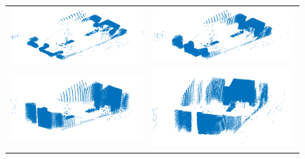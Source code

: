 \begin{figure}%
    \centering
    \begin{tabular}{cc}
      \includegraphics[width=.52\textwidth]{images/pasadizo_8.png}&
      \includegraphics[width=.52\textwidth]{images/pasadizo_7.png}\\
      \includegraphics[width=.52\textwidth]{images/pasadizo_6.png}&
      \includegraphics[width=.52\textwidth]{images/pasadizo_5.png}\\

\end{tabular}
\end{figure}
